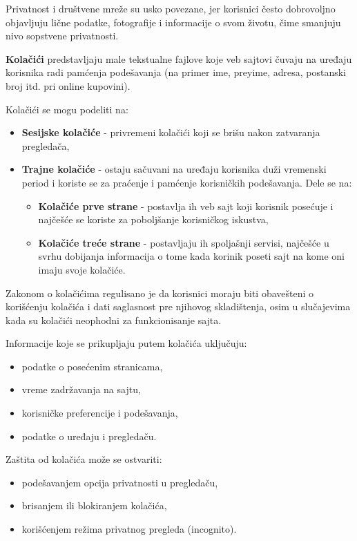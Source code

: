 \documentclass[a4paper, 12pt]{article}
\begin{document}
Privatnost i društvene mreže su usko povezane, jer korisnici često dobrovoljno
objavljuju lične podatke, fotografije i informacije o svom životu, čime smanjuju
nivo sopstvene privatnosti.

\vspace{\baselineskip}

\textbf{Kolačići} predstavljaju male tekstualne fajlove koje veb sajtovi čuvaju na uređaju
korisnika radi pamćenja podešavanja (na primer ime, preyime, adresa, postanski broj itd. pri online kupovini).

Kolačići se mogu podeliti na:
\begin{itemize}
    \item \textbf{Sesijske kolačiće} - privremeni kolačići koji se brišu nakon zatvaranja
    pregledača,
    \item \textbf{Trajne kolačiće} - ostaju sačuvani na uređaju korisnika duži vremenski
    period i koriste se za praćenje i pamćenje korisničkih podešavanja. Dele se na:
    \begin{itemize}
        \item \textbf{Kolačiće prve strane} - postavlja ih veb sajt koji korisnik posećuje i  najčešće se koriste za poboljšanje korisničkog iskustva,
        \item \textbf{Kolačiće treće strane} - postavljaju ih spoljašnji servisi, najčešće
        u svrhu dobijanja informacija o tome kada korinik poseti sajt na kome oni imaju svoje kolačiće.
    \end{itemize}
\end{itemize}


Zakonom o kolačićima regulisano je da korisnici moraju biti obavešteni o korišćenju
kolačića i dati saglasnost pre njihovog skladištenja, osim u slučajevima kada su
kolačići neophodni za funkcionisanje sajta.

Informacije koje se prikupljaju putem kolačića uključuju:
\begin{itemize}
    \item podatke o posećenim stranicama,
    \item vreme zadržavanja na sajtu,
    \item korisničke preferencije i podešavanja,
    \item podatke o uređaju i pregledaču.
\end{itemize}

Zaštita od kolačića može se ostvariti:
\begin{itemize}
    \item podešavanjem opcija privatnosti u pregledaču,
    \item brisanjem ili blokiranjem kolačića,
    \item korišćenjem režima privatnog pregleda (incognito).
\end{itemize}
\end{document}
